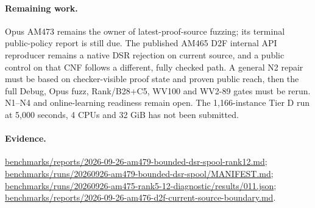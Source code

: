 \documentclass[11pt]{article}
\begin{document}
\paragraph{Remaining work.}
Opus AM473 remains the owner of latest-proof-source fuzzing; its terminal
public-policy report is still due. The published AM465 D2F internal API
reproducer remains a native DSR rejection on current source, and a public
control on that CNF follows a different, fully checked path. A general N2
repair must be based on checker-visible proof state and proven public reach,
then the full Debug, Opus fuzz, Rank/B28+C5, WV100 and WV2-89 gates must be
rerun. N1--N4 and online-learning readiness remain open. The 1,166-instance
Tier D run at 5,000 seconds, 4 CPUs and 32 GiB has not been submitted.

\paragraph{Evidence.}
\url{benchmarks/reports/2026-09-26-am479-bounded-dsr-spool-rank12.md};
\url{benchmarks/runs/20260926-am479-bounded-dsr-spool/MANIFEST.md};
\url{benchmarks/runs/20260926-am475-rank5-12-diagnostic/results/011.json};
\url{benchmarks/reports/2026-09-26-am476-d2f-current-source-boundary.md}.
\end{document}

